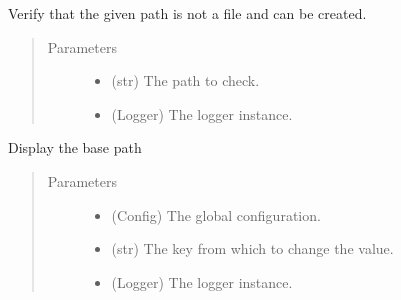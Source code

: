 \documentclass[a4paper,10pt,english]{sphinxmanual}
\begin{document}
\begin{fulllineitems}
\label{\detokenize{apidoc_commands/commands:commands.init.check_path}}
Verify that the given path is not a file and can be created.
\begin{quote}\begin{description}
\item[{Parameters}] \leavevmode\begin{itemize}
\item {} 
 \textendash{} (str) The path to check.

\item {} 
 \textendash{} (Logger) The logger instance.

\end{itemize}

\end{description}\end{quote}

\end{fulllineitems}


\begin{fulllineitems}
\label{\detokenize{apidoc_commands/commands:commands.init.display_local_values}}
Display the base path
\begin{quote}\begin{description}
\item[{Parameters}] \leavevmode\begin{itemize}
\item {} 
 \textendash{} (Config) The global configuration.

\item {} 
 \textendash{} (str) The key from which to change the value.

\item {} 
 \textendash{} (Logger) The logger instance.

\end{itemize}

\end{description}\end{quote}

\end{fulllineitems}
\end{document}
